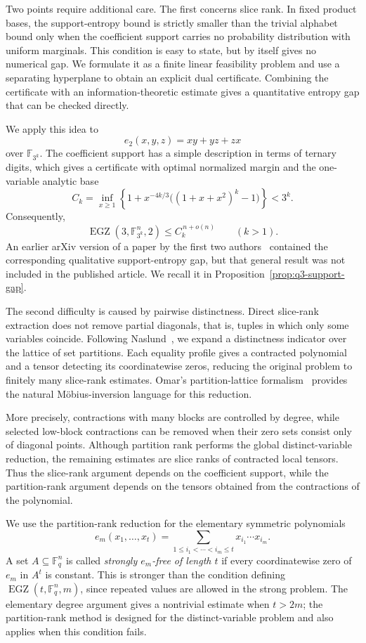 \documentclass[10pt,a4paper]{amsart}
\theoremstyle{definition}
\newcommand{\F}{\mathbb F}
\newcommand{\EGZ}{\operatorname{EGZ}}
\newcommand{\1}{\mathbf 1}
\begin{document}
Two points require additional care.  The first concerns slice rank.  In fixed product bases, the support-entropy bound is strictly smaller than the trivial alphabet bound only when the coefficient support carries no probability distribution with uniform marginals.  This condition is easy to state, but by itself gives no numerical gap.  We formulate it as a finite linear feasibility problem and use a separating hyperplane to obtain an explicit dual certificate.  Combining the certificate with an information-theoretic estimate gives a quantitative entropy gap that can be checked directly.

We apply this idea to
\[
 e_2(x,y,z)=xy+yz+zx
\]
over $\F_{3^k}$.  The coefficient support has a simple description in terms of ternary digits, which gives a certificate with optimal normalized margin and the one-variable analytic base
\[
 C_k=\inf_{x\ge1}\left\{1+x^{-4k/3}\bigl((1+x+x^2)^k-1\bigr)\right\}<3^k.
\]
Consequently,
\[
 \EGZ(3,\F_{3^k}^n,2)\le C_k^{\,n+o(n)}\qquad(k>1).
\]
An earlier arXiv version of a paper by the first two authors~\cite{CostaDellaFiore} contained the corresponding qualitative support-entropy gap, but that general result was not included in the published article.  We recall it in Proposition~\ref{prop:q3-support-gap}. 

The second difficulty is caused by pairwise distinctness.  Direct slice-rank extraction does not remove partial diagonals, that is, tuples in which only some variables coincide.  Following Naslund~\cite{NaslundPartition}, we expand a distinctness indicator over the lattice of set partitions.  Each equality profile gives a contracted polynomial and a tensor detecting its coordinatewise zeros, reducing the original problem to finitely many slice-rank estimates.  Omar's partition-lattice formalism~\cite{OmarPartition} provides the natural M\"obius-inversion language for this reduction.

More precisely, contractions with many blocks are controlled by degree, {while selected low-block contractions can be removed when their zero sets consist only of diagonal points.}  {Although partition rank performs the global distinct-variable reduction, the remaining estimates are slice ranks of contracted local tensors.}  Thus the slice-rank argument depends on the coefficient support, while the partition-rank argument depends on the tensors obtained from the contractions of the polynomial.

We use the partition-rank reduction for the elementary symmetric polynomials
\[
 e_m(x_1,\ldots,x_t)=\sum_{1\le i_1<\cdots<i_m\le t}x_{i_1}\cdots x_{i_m}.
\]
A set $A\subseteq\F_q^n$ is called \emph{strongly $e_m$-free of length $t$} if every coordinatewise zero of $e_m$ in $A^t$ is constant.  This is stronger than the condition defining $\EGZ(t,\F_q^n,m)$, since repeated values are allowed in the strong problem.  The elementary degree argument gives a nontrivial estimate when $t>2m$; the partition-rank method is designed for the distinct-variable problem and also applies when this condition fails.
\end{document}
